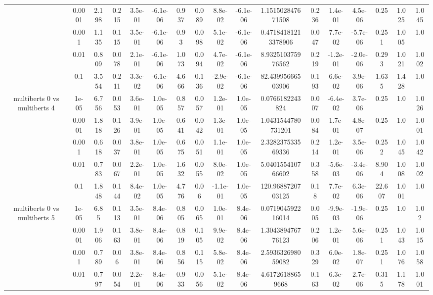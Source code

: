\begin{tabular}{|c|c|c|c|c|c|c|c|c|c|c|c|c|c|c|c|c|}
 & 0.0001 & 2.198 & 0.215 & 3.5e-01 & -6.1e-06 & 0.937 & 0.089 & 8.8e-02 & -6.1e-06 & 1.151502847671508 & 0.236 & 1.4e-01 & 4.5e-06 & 0.25 & 1.025 & 1.045 \\
 & 0.001 & 1.135 & 0.115 & 3.5e-01 & -6.1e-06 & 0.93 & 0.098 & 5.1e-02 & -6.1e-06 & 0.47184181213378906 & 0.047 & 7.7e-02 & -5.7e-06 & 0.251 & 1.005 & 1.0 \\
 & 0.01 & 0.809 & 0.078 & 2.1e-01 & -6.1e-06 & 1.073 & 0.094 & 4.7e-02 & -6.1e-06 & 8.932510375976562 & 0.219 & -1.2e-01 & -2.0e-06 & 0.293 & 1.021 & 1.002 \\
 & 0.1 & 3.554 & 0.211 & 3.3e-02 & -6.1e-06 & 4.666 & 0.136 & -2.9e-02 & -6.1e-06 & 82.43995666503906 & 0.193 & 6.6e-02 & 3.9e-06 & 1.635 & 1.428 & 1.0 \\
\hline
\multirow{5}{*}{multiberts 0 vs multiberts 4} & 1e-05 & 6.756 & 0.053 & 3.6e-01 & 1.0e-05 & 0.857 & 0.057 & 1.2e-01 & 1.0e-05 & 0.0766182243824 & 0.007 & -6.4e-02 & 3.7e-06 & 0.25 & 1.0 & 1.026 \\
 & 0.0001 & 1.818 & 0.126 & 3.9e-01 & 1.0e-05 & 0.641 & 0.042 & 1.3e-01 & 1.0e-05 & 1.0431544780731201 & 0.084 & 1.7e-01 & 4.8e-07 & 0.25 & 1.0 & 1.001 \\
 & 0.001 & 0.618 & 0.037 & 3.8e-01 & 1.0e-05 & 0.675 & 0.051 & 1.1e-01 & 1.0e-05 & 2.328237533569336 & 0.214 & 1.2e-01 & 3.5e-06 & 0.252 & 1.045 & 1.042 \\
 & 0.01 & 0.783 & 0.067 & 2.2e-01 & 1.0e-05 & 1.632 & 0.055 & 8.0e-02 & 1.0e-05 & 5.040155410766602 & 0.358 & -5.6e-03 & -3.4e-06 & 8.904 & 1.008 & 1.002 \\
 & 0.1 & 1.848 & 0.144 & 8.4e-02 & 1.0e-05 & 4.776 & 0.06 & -1.1e-01 & 1.0e-05 & 120.9688720703125 & 0.18 & 7.7e-02 & 6.3e-06 & 22.607 & 1.001 & 1.0 \\
\hline
\multirow{5}{*}{multiberts 0 vs multiberts 5} & 1e-05 & 6.85 & 0.113 & 3.5e-01 & 8.4e-06 & 0.805 & 0.065 & 1.0e-01 & 8.4e-06 & 0.071904592216014 & 0.005 & -9.9e-03 & -1.9e-06 & 0.25 & 1.0 & 1.02 \\
 & 0.0001 & 1.906 & 0.163 & 3.8e-01 & 8.4e-06 & 0.819 & 0.105 & 9.9e-02 & 8.4e-06 & 1.304389476776123 & 0.206 & 1.2e-01 & 5.6e-06 & 0.251 & 1.043 & 1.015 \\
 & 0.001 & 0.789 & 0.06 & 3.8e-01 & 8.4e-06 & 0.856 & 0.115 & 5.8e-02 & 8.4e-06 & 2.593632698059082 & 0.329 & 6.0e-02 & 1.8e-07 & 0.251 & 1.076 & 1.058 \\
 & 0.01 & 0.797 & 0.054 & 2.2e-01 & 8.4e-06 & 0.933 & 0.056 & 5.1e-02 & 8.4e-06 & 4.61726188659668 & 0.163 & 6.3e-02 & 2.7e-06 & 0.315 & 1.178 & 1.001 \\

\end{tabular}
